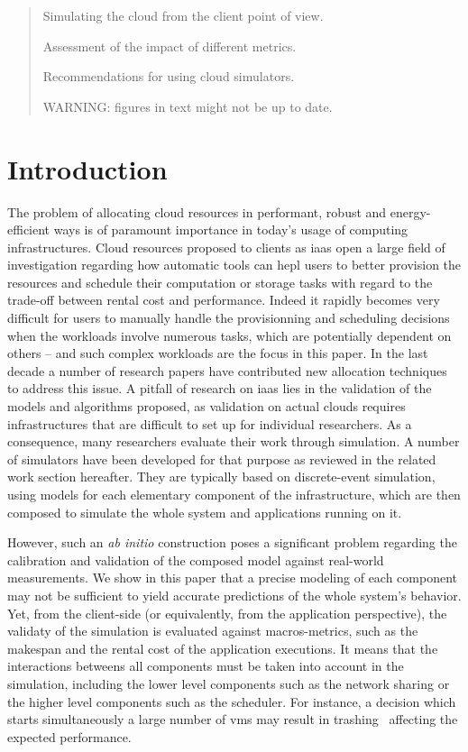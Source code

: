 
\begin{abstract}

Simulating the cloud from the client point of view.

Assessment of the impact of different metrics.

Recommendations for using cloud simulators.

WARNING: figures in text might not be up to date.

\end{abstract}

\section{Introduction}

The  problem   of  allocating   cloud  resources   in  performant,   robust  and
energy-efficient ways is  of paramount importance in today's  usage of computing
infrastructures. Cloud resources  proposed to clients as \ac{iaas}  open a large
field of  investigation regarding how automatic  tools can hepl users  to better
provision the  resources and  schedule their computation  or storage  tasks with
regard to the trade-off between rental  cost and performance.  Indeed it rapidly
becomes  very difficult  for  users  to manually  handle  the provisionning  and
scheduling  decisions  when the  workloads  involve  numerous tasks,  which  are
potentially dependent on  others -- and such complex workloads  are the focus in
this paper. In the last decade a  number of research papers have contributed new
allocation techniques to address this issue.  A pitfall of research on \ac{iaas}
lies in the  validation of the models and algorithms  proposed, as validation on
actual  clouds  requires  infrastructures  that  are difficult  to  set  up  for
individual researchers.  As a consequence,  many researchers evaluate their work
through simulation. A number of simulators  have been developed for that purpose
as reviewed in the related work  section hereafter.  They are typically based on
discrete-event simulation,  using models  for each  elementary component  of the
infrastructure,  which  are then  composed  to  simulate  the whole  system  and
applications running on it.

However, such  an \textit{ab  initio} construction  poses a  significant problem
regarding  the  calibration  and  validation   of  the  composed  model  against
real-world measurements. We  show in this paper that a  precise modeling of each
component  may not  be sufficient  to yield  accurate predictions  of the  whole
system's  behavior.   Yet,  from  the client-side  (or  equivalently,  from  the
application perspective),  the validaty of  the simulation is  evaluated against
macros-metrics, such  as the  makespan and  the rental  cost of  the application
executions. It means that the interactions betweens all components must be taken
into account in the simulation, including the lower level components such as the
network  sharing or  the higher  level components  such as  the scheduler.   For
instance, a decision which starts simultaneously  a large number of \acp{vm} may
result in trashing~\cite{MarshallKF10} affecting the expected performance.

